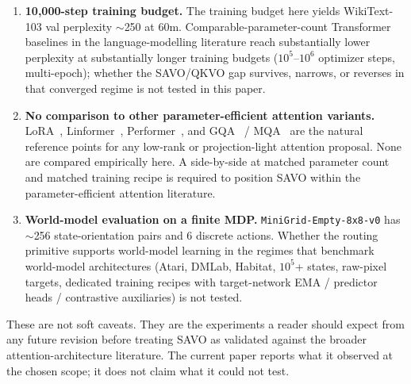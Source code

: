\begin{enumerate}
  \item \textbf{10,000-step training budget.} The training budget here yields WikiText-103 val perplexity ${\sim}$250 at 60m. Comparable-parameter-count Transformer baselines in the language-modelling literature reach substantially lower perplexity at substantially longer training budgets ($10^5$--$10^6$ optimizer steps, multi-epoch); whether the SAVO/QKVO gap survives, narrows, or reverses in that converged regime is not tested in this paper.
  \item \textbf{No comparison to other parameter-efficient attention variants.} LoRA~\cite{ref25}, Linformer~\cite{ref26}, Performer~\cite{ref27}, and GQA~\cite{ref9} / MQA~\cite{ref24} are the natural reference points for any low-rank or projection-light attention proposal. None are compared empirically here. A side-by-side at matched parameter count and matched training recipe is required to position SAVO within the parameter-efficient attention literature.
  \item \textbf{World-model evaluation on a finite MDP.} \texttt{MiniGrid-Empty-8x8-v0} has ${\sim}$256 state-orientation pairs and 6 discrete actions. Whether the routing primitive supports world-model learning in the regimes that benchmark world-model architectures (Atari, DMLab, Habitat, $10^5$+ states, raw-pixel targets, dedicated training recipes with target-network EMA / predictor heads / contrastive auxiliaries) is not tested.
\end{enumerate}

These are not soft caveats. They are the experiments a reader should expect from any future revision before treating SAVO as validated against the broader attention-architecture literature. The current paper reports what it observed at the chosen scope; it does not claim what it could not test.
